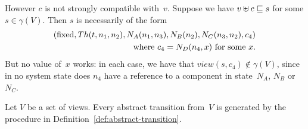 However $c$ is not strongly compatible with~$v$.  Suppose we have \( v \uplus
c \sqsubseteq s \) for some $s \in \gamma(V)$.  Then $s$ is necessarily of the form
\[
\begin{align}
(\mathrm{fixed}, Th(t,n_1,n_2), N_A(n_1, n_3), N_B(n_2), N_C(n_3,n_2), c_4) \\
\qquad \mbox{where $c_4 = N_D(n_4,x)$ for some $x$.}
\end{align}
\]
But no value of~$x$ works: in each case, we have that $view(s, c_4) \nin
\gamma(V)$, since in no system state does $n_4$ have a reference to a
component in state~$N_A$, $N_B$ or~$N_C$.



\begin{lemma}
Let $V$ be a set of views.  Every abstract transition from~$V$ is generated by
the procedure in Definition~\ref{def:abstract-transition}.
\end{lemma}

